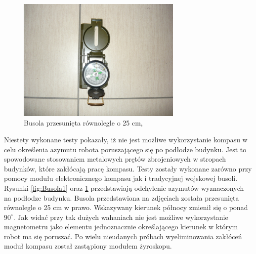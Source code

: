 \begin{figure}[!ht]
 \centering
 \includegraphics[height=60mm]{../images/ch04/compass02.jpg}
 \caption{Busola przesunięta równolegle o 25 cm,}
 \label{fig:Busola2}
\end{figure}

Niestety wykonane testy pokazały, iż nie jest możliwe wykorzystanie kompasu w celu określenia azymutu robota poruszającego się po podłodze budynku. Jest to spowodowane stosowaniem metalowych prętów zbrojeniowych w stropach budynków, które zakłócają pracę kompasu. Testy zostały wykonane zarówno przy pomocy modułu elektronicznego kompasu jak i tradycyjnej wojskowej busoli. Rysunki \ref{fig:Busola1} oraz \ref{fig:Busola2} przedstawiają odchylenie azymutów wyznaczonych na podłodze budynku. Busola przedstawiona na zdjęciach została przesunięta równolegle o 25 cm w prawo. Wskazywany kierunek północy zmienił się o ponad $90^{\circ}$. Jak widać przy tak dużych wahaniach nie jest możliwe wykorzystanie magnetometru jako elementu jednoznacznie określającego kierunek w którym robot ma się poruszać. Po wielu nieudanych próbach wyeliminowania zakłóceń moduł kompasu został zastąpiony modułem żyroskopu.

